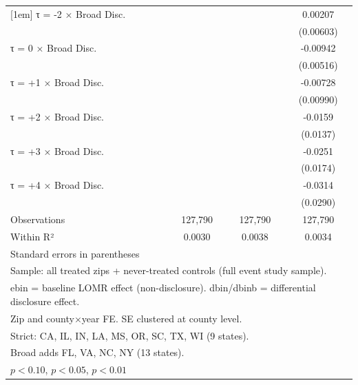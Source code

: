 \begin{table}[htbp]
\begin{tabular}{l*{3}{c}}
[1em]
τ = -2 × Broad Disc.&                     &                     &     0.00207         \\
                    &                     &                     &   (0.00603)         \\
[1em]
τ = 0 × Broad Disc. &                     &                     &    -0.00942\sym{*}  \\
                    &                     &                     &   (0.00516)         \\
[1em]
τ = +1 × Broad Disc.&                     &                     &    -0.00728         \\
                    &                     &                     &   (0.00990)         \\
[1em]
τ = +2 × Broad Disc.&                     &                     &     -0.0159         \\
                    &                     &                     &    (0.0137)         \\
[1em]
τ = +3 × Broad Disc.&                     &                     &     -0.0251         \\
                    &                     &                     &    (0.0174)         \\
[1em]
τ = +4 × Broad Disc.&                     &                     &     -0.0314         \\
                    &                     &                     &    (0.0290)         \\
\hline
Observations        &     127,790         &     127,790         &     127,790         \\
Within R²           &      0.0030         &      0.0038         &      0.0034         \\
\hline\hline
\multicolumn{4}{l}{\footnotesize Standard errors in parentheses}\\
\multicolumn{4}{l}{\footnotesize Sample: all treated zips + never-treated controls (full event study sample).}\\
\multicolumn{4}{l}{\footnotesize ebin = baseline LOMR effect (non-disclosure). dbin/dbinb = differential disclosure effect.}\\
\multicolumn{4}{l}{\footnotesize Zip and county×year FE. SE clustered at county level.}\\
\multicolumn{4}{l}{\footnotesize Strict: CA, IL, IN, LA, MS, OR, SC, TX, WI (9 states).}\\
\multicolumn{4}{l}{\footnotesize Broad adds FL, VA, NC, NY (13 states).}\\
\multicolumn{4}{l}{\footnotesize \sym{*} \(p<0.10\), \sym{**} \(p<0.05\), \sym{***} \(p<0.01\)}\\
\end{tabular}
\end{table}
